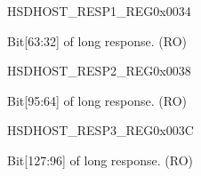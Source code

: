 \begin{register}{H}{SDHOST\_RESP1\_REG}{0x{}0034}\label{regdesc:RESP1REG}
%
\regnewline%
\begin{regdesc}\begin{reglist}
\item [SDHOST\_RESP1\_REG]Bit[63:32] of long response. (RO)
\end{reglist}\end{regdesc}
\end{register}


\begin{register}{H}{SDHOST\_RESP2\_REG}{0x{}0038}\label{regdesc:RESP2REG}
%
\regnewline%
\begin{regdesc}\begin{reglist}
\item [SDHOST\_RESP2\_REG]Bit[95:64] of long response. (RO)
\end{reglist}\end{regdesc}
\end{register}


\begin{register}{H}{SDHOST\_RESP3\_REG}{0x{}003C}\label{regdesc:RESP3REG}
%
\regnewline%
\begin{regdesc}\begin{reglist}
\item [SDHOST\_RESP3\_REG]Bit[127:96] of long response. (RO)
\end{reglist}\end{regdesc}
\end{register}


